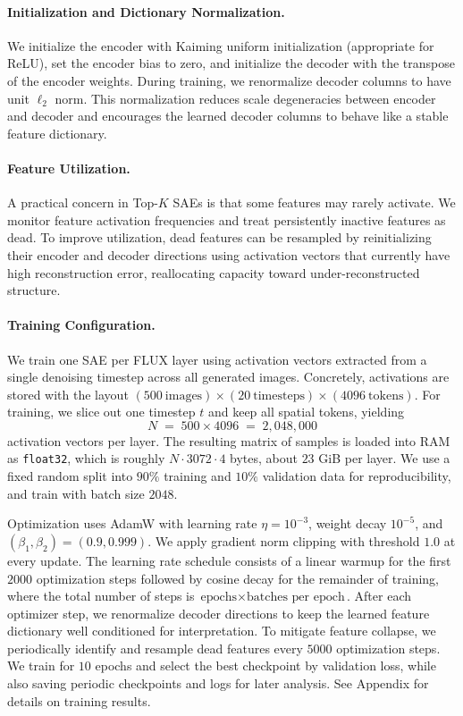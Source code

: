 \documentclass{article}
\begin{document}
\paragraph{Initialization and Dictionary Normalization.}
We initialize the encoder with Kaiming uniform initialization (appropriate for ReLU), set the encoder bias to zero, and initialize the decoder with the transpose of the encoder weights. During training, we renormalize decoder columns to have unit $\ell_2$ norm. This normalization reduces scale degeneracies between encoder and decoder and encourages the learned decoder columns to behave like a stable feature dictionary.

\paragraph{Feature Utilization.}
A practical concern in Top-$K$ SAEs is that some features may rarely activate. We monitor feature activation frequencies and treat persistently inactive features as dead. To improve utilization, dead features can be resampled by reinitializing their encoder and decoder directions using activation vectors that currently have high reconstruction error, reallocating capacity toward under-reconstructed structure.

\paragraph{Training Configuration.}
We train one SAE per FLUX layer using activation vectors extracted from a single denoising timestep across all generated images. Concretely, activations are stored with the layout \((500\ \text{images}) \times (20\ \text{timesteps}) \times (4096\ \text{tokens})\). For training, we slice out one timestep \(t\) and keep all spatial tokens, yielding
\[
N \;=\; 500 \times 4096 \;=\; 2{,}048{,}000
\]
activation vectors per layer. The resulting matrix of samples is loaded into RAM as \texttt{float32}, which is roughly \(N \cdot 3072 \cdot 4\) bytes, about \(23\) GiB per layer. We use a fixed random split into \(90\%\) training and \(10\%\) validation data for reproducibility, and train with batch size \(2048\).

Optimization uses AdamW with learning rate \(\eta = 10^{-3}\), weight decay \(10^{-5}\), and \((\beta_1,\beta_2) = (0.9, 0.999)\). We apply gradient norm clipping with threshold \(1.0\) at every update. The learning rate schedule consists of a linear warmup for the first \(2000\) optimization steps followed by cosine decay for the remainder of training, where the total number of steps is \(\text{epochs} \times \text{batches per epoch}\). After each optimizer step, we renormalize decoder directions to keep the learned feature dictionary well conditioned for interpretation. To mitigate feature collapse, we periodically identify and resample dead features every \(5000\) optimization steps. We train for \(10\) epochs and select the best checkpoint by validation loss, while also saving periodic checkpoints and logs for later analysis. See Appendix for details on training results.
\end{document}
